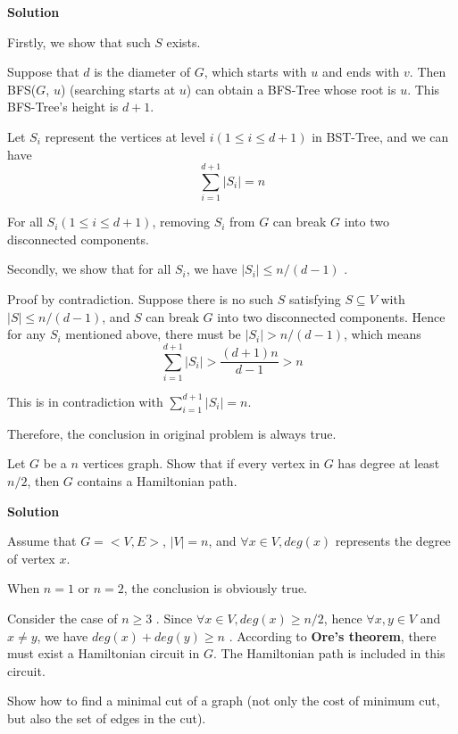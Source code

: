 \documentclass{article}
\newcounter{exercise}
\newcommand{\<}{
    \langle}
\renewcommand{\>}{
    \rangle}
\begin{document}
{\begin{exercise}
\bigskip
\noindent \textbf{Solution}

Firstly, we show that such $S$ exists.

Suppose that $d$ is the diameter of $G$, which starts with $u$ and ends with $v$. Then BFS($G$, $u$) (searching starts at $u$) can obtain a BFS-Tree whose root is $u$. This BFS-Tree's height is $d+1$.

Let $S_i$ represent the vertices at level $i (1 \le i \le d+1)$ in BST-Tree, and we can have
$$
\sum_{i=1}^{d+1}{|S_i|} = n
$$

For all $S_i(1 \le i \le d+1)$, removing $S_i$ from $G$ can break $G$ into two disconnected components.

Secondly, we show that for all $S_i$, we have $|S_i| \le n/(d-1)$ .

Proof by contradiction. Suppose there is no such $S$ satisfying $S \subseteq V$ with $|S| \le n/(d-1)$, and $S$ can break $G$ into two disconnected components. Hence for any $S_i$ mentioned above, there must be $|S_i| > n/(d-1)$, which means
$$
\sum_{i=1}^{d+1}{|S_i|} > \frac{(d+1)n}{d-1} > n
$$

This is in contradiction with $\sum_{i=1}^{d+1}{|S_i|} = n$.

Therefore, the conclusion in original problem is always true.

\end{exercise}

\begin{exercise}
Let $G$ be a $n$ vertices graph. Show that if every vertex in $G$ has degree at least $n/2$, then $G$ contains a Hamiltonian path.
\end{exercise}

\newpage
\noindent \textbf{Solution}

Assume that $G=<V, E>$, $|V| = n$, and $\forall{x \in V}, deg(x)$ represents the degree of vertex $x$.

When $n=1$ or $n=2$, the conclusion is obviously true.

Consider the case of $n \ge 3$ . Since $\forall{x \in V}, deg(x) \ge n/2$, hence $\forall{x, y \in V}$ and $x \not= y$, we have $deg(x)+ deg(y) \ge n$ . According to \textbf{Ore's theorem}, there must exist a Hamiltonian circuit in $G$. The Hamiltonian path is included in this circuit.


\begin{exercise}
Show how to find a minimal cut of a graph (not only the cost of minimum cut, but also the set of edges in the cut).
\end{exercise}

}
\end{document}
